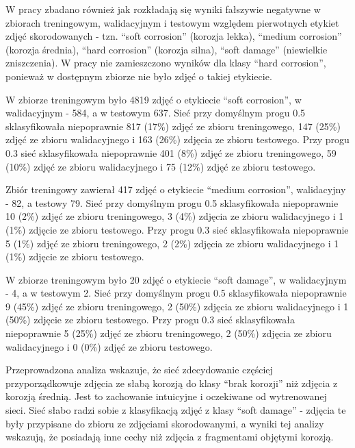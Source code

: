 \documentclass[polish,12pt]{aghthesis}
\begin{document}
\par W pracy zbadano również jak rozkładają się wyniki fałszywie negatywne w zbiorach treningowym, walidacyjnym i testowym względem pierwotnych etykiet zdjęć skorodowanych - tzn. ``soft corrosion'' (korozja lekka), ``medium corrosion'' (korozja średnia), ``hard corrosion'' (korozja silna), ``soft damage'' (niewielkie zniszczenia). W pracy nie zamieszczono wyników dla klasy ``hard corrosion'', ponieważ w dostępnym zbiorze nie było zdjęć o takiej etykiecie.
\par W zbiorze treningowym było 4819 zdjęć o etykiecie ``soft corrosion'', w walidacyjnym - 584, a w testowym 637. Sieć przy domyślnym progu 0.5 sklasyfikowała niepoprawnie 817 (17\%) zdjęć ze zbioru treningowego, 147 (25\%) zdjęć ze zbioru walidacyjnego i 163 (26\%) zdjęcia ze zbioru testowego.
Przy progu 0.3 sieć sklasyfikowała niepoprawnie 401 (8\%) zdjęć ze zbioru treningowego, 59 (10\%) zdjęć ze zbioru walidacyjnego i 75 (12\%) zdjęć ze zbioru testowego.
\par Zbiór treningowy zawierał 417 zdjęć o etykiecie ``medium corrosion'', walidacyjny - 82, a testowy 79. Sieć przy domyślnym progu 0.5 sklasyfikowała niepoprawnie 10 (2\%) zdjęć ze zbioru treningowego, 3 (4\%) zdjęcia ze zbioru walidacyjnego i 1 (1\%) zdjęcie ze zbioru testowego.
Przy progu 0.3 sieć sklasyfikowała niepoprawnie 5 (1\%) zdjęć ze zbioru treningowego, 2 (2\%) zdjęcia ze zbioru walidacyjnego i 1 (1\%) zdjęcie ze zbioru testowego.
\par W zbiorze treningowym było 20 zdjęć o etykiecie ``soft damage'', w walidacyjnym - 4, a w testowym 2. Sieć przy domyślnym progu 0.5 sklasyfikowała niepoprawnie 9 (45\%) zdjęć ze zbioru treningowego, 2 (50\%) zdjęcia ze zbioru walidacyjnego i 1 (50\%) zdjęcie ze zbioru testowego.
Przy progu 0.3 sieć sklasyfikowała niepoprawnie 5 (25\%) zdjęć ze zbioru treningowego, 2 (50\%) zdjęcia ze zbioru walidacyjnego i 0 (0\%) zdjęć ze zbioru testowego.
\par Przeprowadzona analiza wskazuje, że sieć zdecydowanie częściej przyporządkowuje zdjęcia ze słabą korozją do klasy ``brak korozji'' niż zdjęcia z korozją średnią. Jest to zachowanie intuicyjne i oczekiwane od wytrenowanej sieci. Sieć słabo radzi sobie z klasyfikacją zdjęć z klasy ``soft damage'' - zdjęcia te były przypisane do zbioru ze zdjęciami skorodowanymi, a wyniki tej analizy wskazują, że posiadają inne cechy niż zdjęcia z fragmentami objętymi korozją.
\end{document}
